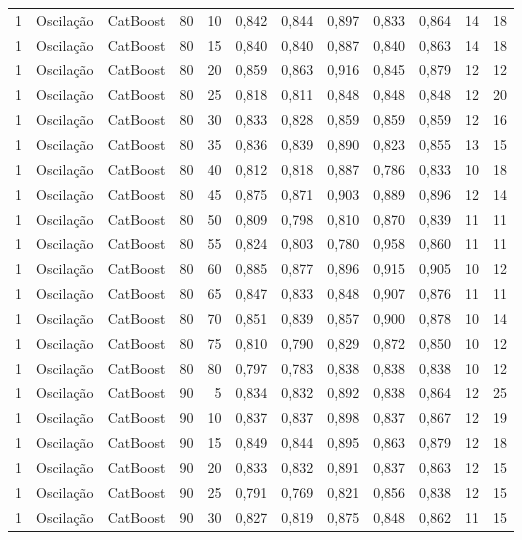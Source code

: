 \begin{longtable}{ccclrrrrrrrr}
1 & Oscilação & CatBoost & 80 & 10 & 0,842 & 0,844 & 0,897 & 0,833 & 0,864 & 14 & 18 \\
1 & Oscilação & CatBoost & 80 & 15 & 0,840 & 0,840 & 0,887 & 0,840 & 0,863 & 14 & 18 \\
1 & Oscilação & CatBoost & 80 & 20 & 0,859 & 0,863 & 0,916 & 0,845 & 0,879 & 12 & 12 \\
1 & Oscilação & CatBoost & 80 & 25 & 0,818 & 0,811 & 0,848 & 0,848 & 0,848 & 12 & 20 \\
1 & Oscilação & CatBoost & 80 & 30 & 0,833 & 0,828 & 0,859 & 0,859 & 0,859 & 12 & 16 \\
1 & Oscilação & CatBoost & 80 & 35 & 0,836 & 0,839 & 0,890 & 0,823 & 0,855 & 13 & 15 \\
1 & Oscilação & CatBoost & 80 & 40 & 0,812 & 0,818 & 0,887 & 0,786 & 0,833 & 10 & 18 \\
1 & Oscilação & CatBoost & 80 & 45 & 0,875 & 0,871 & 0,903 & 0,889 & 0,896 & 12 & 14 \\
1 & Oscilação & CatBoost & 80 & 50 & 0,809 & 0,798 & 0,810 & 0,870 & 0,839 & 11 & 11 \\
1 & Oscilação & CatBoost & 80 & 55 & 0,824 & 0,803 & 0,780 & 0,958 & 0,860 & 11 & 11 \\
1 & Oscilação & CatBoost & 80 & 60 & 0,885 & 0,877 & 0,896 & 0,915 & 0,905 & 10 & 12 \\
1 & Oscilação & CatBoost & 80 & 65 & 0,847 & 0,833 & 0,848 & 0,907 & 0,876 & 11 & 11 \\
1 & Oscilação & CatBoost & 80 & 70 & 0,851 & 0,839 & 0,857 & 0,900 & 0,878 & 10 & 14 \\
1 & Oscilação & CatBoost & 80 & 75 & 0,810 & 0,790 & 0,829 & 0,872 & 0,850 & 10 & 12 \\
1 & Oscilação & CatBoost & 80 & 80 & 0,797 & 0,783 & 0,838 & 0,838 & 0,838 & 10 & 12 \\
1 & Oscilação & CatBoost & 90 & 5 & 0,834 & 0,832 & 0,892 & 0,838 & 0,864 & 12 & 25 \\
1 & Oscilação & CatBoost & 90 & 10 & 0,837 & 0,837 & 0,898 & 0,837 & 0,867 & 12 & 19 \\
1 & Oscilação & CatBoost & 90 & 15 & 0,849 & 0,844 & 0,895 & 0,863 & 0,879 & 12 & 18 \\
1 & Oscilação & CatBoost & 90 & 20 & 0,833 & 0,832 & 0,891 & 0,837 & 0,863 & 12 & 15 \\
1 & Oscilação & CatBoost & 90 & 25 & 0,791 & 0,769 & 0,821 & 0,856 & 0,838 & 12 & 15 \\
1 & Oscilação & CatBoost & 90 & 30 & 0,827 & 0,819 & 0,875 & 0,848 & 0,862 & 11 & 15 \\

\end{longtable}
